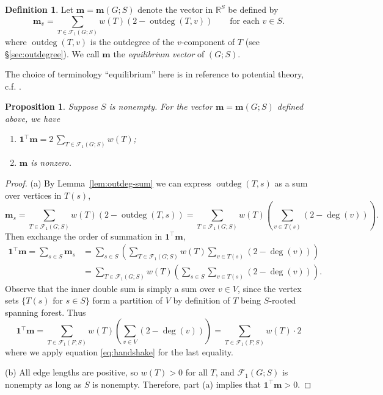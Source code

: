 \documentclass[12pt]{amsart}
\newtheorem{prop}[thm]{Proposition}
\theoremstyle{definition}
\newtheorem{dfn}[thm]{Definition}
\newcommand{\RR}{\mathbb{R}}
\newcommand{\bone}{\mathbf{1}}
\newcommand{\boldm}{\mathbf{m}}
\newcommand{\tr}{\intercal}
\newcommand{\trees}{\mathcal{F}_1}
\DeclareMathOperator{\outdeg}{outdeg}
\begin{document}
\begin{dfn}
\label{dfn:m-vector}
Let $\boldm = \boldm(G;S)$ denote the vector in $\RR^S$ be defined by
\begin{equation}
\label{eq:m-vector}
\boldm_v =  \sum_{T \in \trees(G;S)} w({T}) (2 - \outdeg(T,v))
\qquad\text{for each }v \in S.
\end{equation}
where $\outdeg(T,v)$ is the outdegree of the $v$-component of $T$ (see \S\ref{sec:outdegree}).
We call $\boldm$ the {\em equilibrium vector} of $(G; S)$.
\end{dfn}

The choice of terminology ``equilibrium'' here is in reference to potential theory, c.f. \cite{Tsu}\cite{steinerberger}.

\begin{prop}
\label{prop:m-sum}
Suppose $S$ is nonempty.
For the vector $\boldm = \boldm(G; S)$ defined above, we have
\begin{enumerate}[label=(\alph*)]
\item
$\displaystyle \bone^\tr \boldm = 2 \,\sum_{T \in \trees(G;S)} w({T})$;

\item 
$\boldm$ is nonzero.
\end{enumerate}
\end{prop}
\begin{proof}
(a)
By Lemma~\ref{lem:outdeg-sum} we can express $\outdeg(T, s)$ as a sum over vertices in $T(s)$,
\[
	\boldm_s = \sum_{T \in \trees(G;S)} w({T}) (2 - \outdeg (T,s))
= \sum_{T \in \trees(G;S)} w({T}) \left( \sum_{v \in T(s)}(2 - \deg(v))\right).
\]
Then exchange the order of summation in $\bone^\tr \boldm$,
\begin{align}
	\bone^\tr \boldm = \sum_{s\in S} \boldm_s &= \sum_{s \in S} \left( \sum_{T \in \trees(G;S)} w({T}) \sum_{v \in T(s)}(2 - \deg(v)) \right) \\
	&= \sum_{T \in \trees(G;S)} w({T}) \left( \sum_{s\in S} \sum_{v \in T(s)} (2 - \deg(v)) \right) .
\end{align}
Observe that the inner double sum is simply a sum over $v \in V$,
since the vertex sets $\{T(s) \text{ for } s \in S\}$ form a partition of $V$ by definition of $T$ being $S$-rooted spanning forest.
Thus 
\[
	\bone^\tr \boldm = \sum_{T \in \trees(F;S)} w({T}) \left( \sum_{v \in V} (2 - \deg(v))\right)
	= \sum_{T \in \trees(F;S)} w({T}) \cdot 2 
\]
where we apply equation \eqref{eq:handshake} for the last equality.

(b) 
All edge lengths are positive, so $w({T}) > 0$ for all $T$, and $\trees(G; S)$ is nonempty as long as $S$ is nonempty. 
Therefore, part (a) implies that $\bone^\tr \boldm > 0$.
\end{proof}
\end{document}
